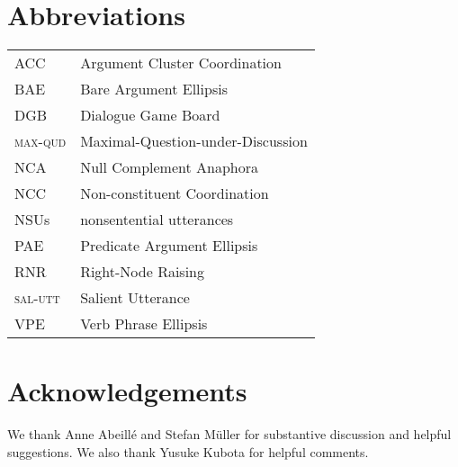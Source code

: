 {\section*{Abbreviations}

\begin{tabularx}{.99\textwidth}{@{}lX}
ACC & Argument Cluster Coordination\\
BAE & Bare Argument Ellipsis\\
DGB & Dialogue Game Board\\
\textsc{max-qud} & Maximal-Question-under-Discussion\\
NCA & Null Complement Anaphora\\
NCC & Non-constituent Coordination\\ 
NSUs & nonsentential utterances\\
PAE & Predicate Argument Ellipsis\\
RNR & Right-Node Raising\\
\textsc{sal-utt} & Salient Utterance\\
VPE & Verb Phrase Ellipsis\\
\end{tabularx}


\section*{Acknowledgements}
We thank Anne Abeill\'{e} and Stefan M\"{u}ller
for substantive discussion and helpful suggestions. We also thank  
Yusuke Kubota for helpful comments.  

{\sloppy
\printbibliography[heading=subbibliography,notkeyword=this]
}
%
}%



